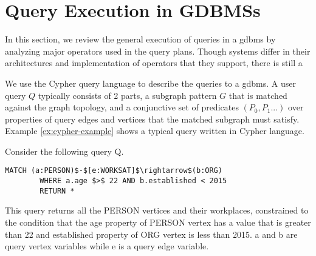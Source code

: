 \section{Query Execution in GDBMSs}
\label{sec:operators}

In this section, we review the general execution of queries in a \gls{gdbms} by analyzing major operators used in the query plans. Though systems differ in their architectures and implementation of operators that they support, there is still a 

We use the Cypher query language \cite{cypher} to describe the queries to a \gls{gdbms}.  A user query $Q$ typically consists of 2 parts, 
a subgraph pattern $G$ that is matched against the graph topology, and a conjunctive set of predicates $(P_0, P_1 ...)$ over properties of query edges and vertices that the matched subgraph must satisfy. Example \ref{ex:cypher-example} shows a typical query written in Cypher language.

\vspace{-4pt}
\begin{example}
	\label{ex:cypher-example}
	Consider the following query Q. 
	{\em 
		\begin{lstlisting}[numbers=none,  showstringspaces=false,belowskip=0pt ]
		MATCH (a:PERSON)$-$[e:WORKSAT]$\rightarrow$(b:ORG)
		WHERE a.age $>$ 22 AND b.established < 2015
		RETURN *\end{lstlisting}
	}
	This query returns all the PERSON vertices and their workplaces, constrained to the condition that the \textsc{}age\textsc{} property of PERSON vertex has a value that is greater than 22 and \textsc{}established\textsc{} property of ORG vertex is less than 2015. a and b are query vertex variables while e is a query edge variable.
\end{example}
\vspace{-5pt}

